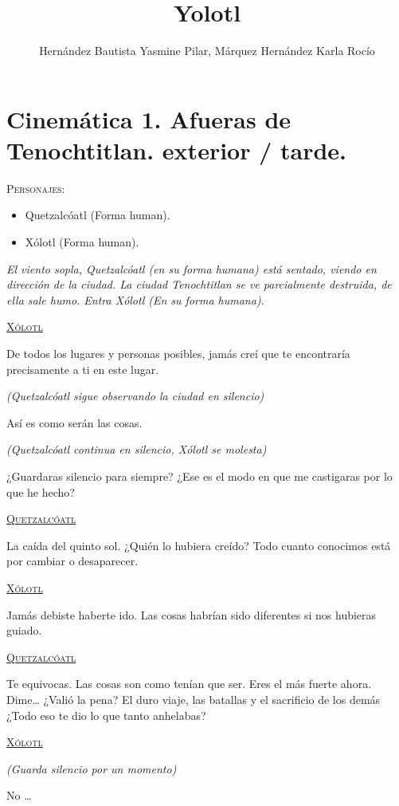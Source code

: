 \documentclass[11pt,letterpaper]{article}
\begin{document}
	\author{Hernández Bautista Yasmine Pilar, Márquez 		Hernández Karla Rocío}
	\title{Yolotl}
	\maketitle
	\tableofcontents
	\section{Cinemática 1. Afueras de Tenochtitlan. exterior / tarde.}
	
\textsc{Personajes}:
\begin{itemize}
	\item Quetzalcóatl (Forma human).
	\item Xólotl (Forma human).
\end{itemize}
\textit{El viento sopla, Quetzalcóatl (en su forma humana) está sentado, viendo en dirección de la ciudad. La ciudad Tenochtitlan se ve parcialmente destruida, de ella sale humo. Entra Xólotl (En su forma humana)}.
\begin{center}
\textsc{\underline{Xólotl}}
\par
De todos los lugares y personas posibles, jamás creí que te encontraría precisamente a ti en este lugar.
\par
\textit{(Quetzalcóatl sigue observando la ciudad en silencio)}
\par
Así es como serán las cosas.
\par 
\textit{(Quetzalcóatl continua en silencio, Xólotl se molesta)}
\par
¿Guardaras silencio para siempre? ¿Ese es el modo en que me castigaras por lo que he hecho?
\\
\par
\textsc{\underline{Quetzalcóatl}}
\par
La caída del quinto sol. ¿Quién lo hubiera creído? Todo cuanto conocimos está por cambiar o desaparecer.
\par
\par
\textsc{\underline{Xólotl}}
\\
\par
Jamás debiste haberte ido. Las cosas habrían sido diferentes si nos hubieras guiado.
\\
\par
\textsc{\underline{Quetzalcóatl}}
\par
Te equivocas. Las cosas son como tenían que ser. Eres el más fuerte ahora. Dime… ¿Valió la pena? El duro viaje, las batallas y el sacrificio de los demás ¿Todo eso te dio lo que tanto anhelabas?
\\
\par
\textsc{\underline{Xólotl}}
\\
\par
\textit{(Guarda silencio por un momento)}
\\
\par
No …
\end{center}
\end{document}
